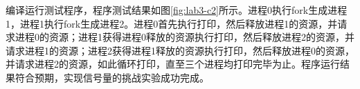 编译运行测试程序，程序测试结果如图\ref{fig:lab3-c2}所示。进程0执行fork生成进程1，进程1执行fork生成进程2。进程0首先执行打印，然后释放进程1的资源，并请求进程0的资源；进程1获得进程0释放的资源执行打印，然后释放进程2的资源，并请求进程1的资源；进程2获得进程1释放的资源执行打印，然后释放进程0的资源，并请求进程2的资源，如此循环打印，直至三个进程均打印完毕为止。程序运行结果符合预期，实现信号量的挑战实验成功完成。
\begin{figure}[H]
  \centering
  \hspace{0.5in} %
  \subfigure{
}
\end{figure}
